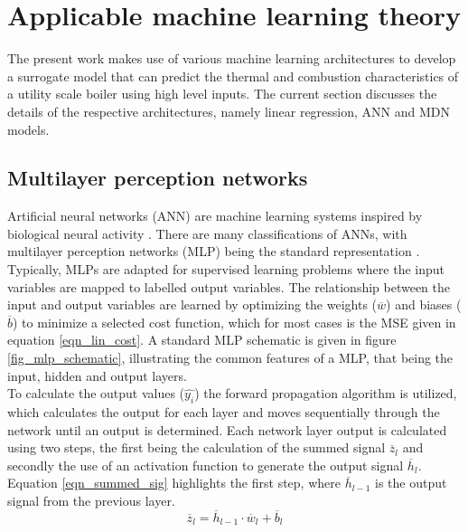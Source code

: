 \documentclass[a4paper,fleqn]{cas-sc}
\begin{document}
\section{Applicable machine learning theory}
The present work makes use of various machine learning architectures to develop a surrogate model that can predict the thermal and combustion characteristics of a utility scale boiler using high level inputs. The current section discusses the details of the respective architectures, namely linear regression, ANN and MDN models.
 
\subsection{Multilayer perception networks}
Artificial neural networks (ANN) are machine learning systems inspired by biological neural activity \cite{Rasmussen2006}. There are many classifications of ANNs, with multilayer perception networks (MLP) being the standard representation \citep{goodfellow}. Typically, MLPs are adapted for supervised learning problems where the input variables are mapped to labelled output variables. The relationship between the input and output variables are learned by optimizing the weights ($\overline{w}$) and biases ($\overline{b}$) to minimize a selected cost function, which for most cases is the MSE given in equation \ref{eqn_lin_cost}. A standard MLP schematic is given in figure \ref{fig_mlp_schematic}, illustrating the common features of a MLP, that being the input, hidden and output layers.\\

To calculate the output values ($\hat{y_i}$) the forward propagation algorithm is utilized, which calculates the output for each layer and moves sequentially through the network until an output is determined. Each network layer output is calculated using two steps, the first being the calculation of the summed signal $\overline{z}_l$ and secondly the use of an activation function to generate the output signal $\overline{h}_l$. Equation \ref{eqn_summed_sig} highlights the first step, where $\overline{h}_{l-1}$ is the output signal from the previous layer.
\begin{equation}\label{eqn_summed_sig}
\overline{z}_l = \overline{h}_{l-1}\cdot\overline{w}_l+\overline{b}_l
\end{equation}
\end{document}
